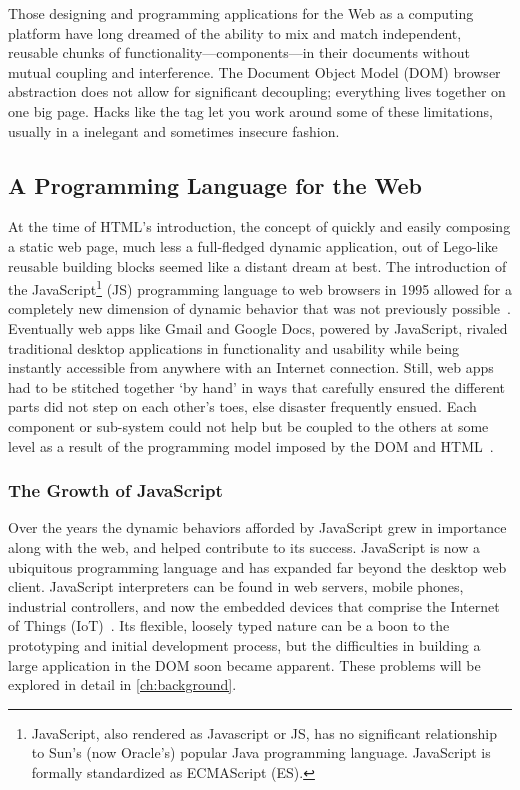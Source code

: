 Those designing and programming applications for the Web as a computing platform have long dreamed of the ability to mix and match independent, reusable chunks of functionality---components---in their documents without mutual coupling and interference. 
The Document Object Model (DOM)
browser abstraction does not allow for significant decoupling; 
everything lives together on one big page. Hacks like the 
tag let you work around some of these limitations, usually in a inelegant and sometimes insecure fashion.

\subsection{A Programming Language for the Web}
At the time of HTML's introduction, the concept of quickly and easily composing a static web page, 
much less a full-fledged dynamic application, 
out of Lego-like reusable building blocks seemed like a distant dream at best. 
The introduction of the 
JavaScript\footnote{JavaScript, also rendered as Javascript or JS, 
has no significant relationship to Sun's (now Oracle's) popular Java programming language. JavaScript is formally standardized as ECMAScript (ES).}
(JS) programming language to web browsers in 1995 allowed for a completely new dimension of dynamic behavior that was not previously possible~\cite{w3ccontributors2012}.
Eventually web apps like Gmail and Google Docs, powered by JavaScript, rivaled traditional desktop applications in functionality and usability while being instantly accessible from anywhere with an Internet connection.
Still, web apps had to be stitched together `by hand' in ways that carefully ensured the different parts did not step on each other's toes, else disaster frequently ensued. 
Each component or sub-system could not help but be coupled to the others at some level as a result of the programming model imposed by the DOM and HTML~\cite{ihrig2012}.

\subsubsection{The Growth of JavaScript}
Over the years the dynamic behaviors afforded by JavaScript grew in importance along with the web, and helped contribute to its success. 
JavaScript is now a ubiquitous programming language and has expanded far beyond the desktop web client. 
JavaScript interpreters can be found in web servers, mobile phones, industrial controllers, and now the embedded devices that comprise the Internet of Things (IoT)~\cite{flaki2015}.
Its flexible, loosely typed nature can be a boon to the prototyping and initial development process,
but the difficulties in building a large application in the DOM soon became apparent.
These problems will be explored in detail in \cref{ch:background}.

